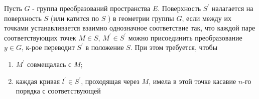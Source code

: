 \documentclass[10pt]{article}
\begin{document}
Пусть $G$ - группа преобразований пространства $E$. Поверхность $S^{\prime}$ налагается на поверхность $S$ (или катится по $S$ ) в геометрии группы $G$, если между их точками устанавливается взаимно однозначное соответствие так, что каждой паре соответствующих точек $M \in S$, $M^{\prime} \in S^{\prime}$ можно присоединить преобразование $y \in G$, к-рое переводит $S^{\prime}$ в положение $S$. При этом требуется, чтобы



\begin{enumerate}

  \item $M^{\prime}$ совмещалась с $M$;



  \item каждая кривая $l^{\prime} \in S^{\prime}$, проходящая через $M$, имела в этой точке касавие $n$-го порядка с соответствующей



\end{enumerate}
\end{document}

